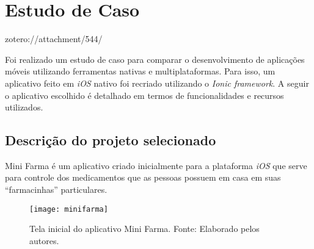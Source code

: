 \chapter{Estudo de Caso} \label{cap:estudodecaso}

zotero://attachment/544/

Foi realizado um estudo de caso para comparar o desenvolvimento de aplicações móveis utilizando ferramentas nativas e multiplataformas. Para isso, um aplicativo feito em \textit{iOS} 
nativo foi recriado utilizando o \textit{Ionic framework}. A seguir o aplicativo escolhido é detalhado em termos de funcionalidades e recursos utilizados. 

\section{Descrição do projeto selecionado} \label{sec:descricaodoprojeto}

Mini Farma é um aplicativo criado inicialmente para a plataforma \textit{iOS} que serve para controle dos medicamentos que as 
pessoas possuem em casa em suas ``farmacinhas'' particulares.

\begin{figure}[h]
  \centering
    \texttt{[image: minifarma]}
    \caption[Tela inicial do aplicativo Mini Farma]{ Tela inicial do aplicativo Mini Farma. Fonte: Elaborado pelos autores.}
	\label{fig:minifarma}
\end{figure}

